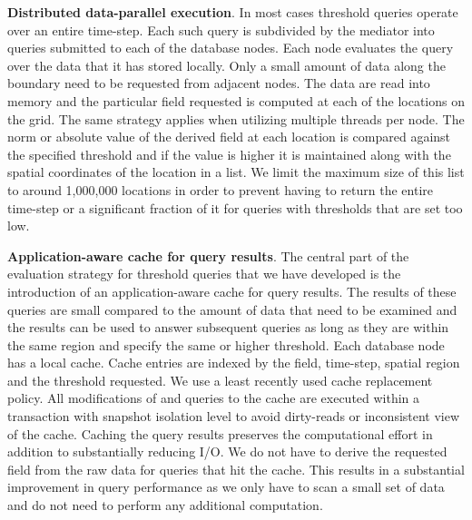 \documentclass{sig-alternate}
\newcommand{\kk}[1]{{\color{blue}{\it KK: #1}}}
\begin{document}
{\bf Distributed data-parallel execution}. In most cases threshold queries operate over an entire time-step. Each such query is subdivided by 
the mediator into queries submitted to
each of the database nodes. Each node evaluates the query over the data that it has stored locally. Only a small amount of data along the boundary
need to be requested from adjacent nodes. The data are read into memory and the particular field requested is computed at each of the locations on
the grid. The same strategy applies when utilizing multiple threads per node. The norm or absolute value of the derived field at each location is compared 
against the specified threshold and if the value is higher it is maintained along with
the spatial coordinates of the location in a list. We limit the maximum size of this list to around 1,000,000 locations in order to prevent having to return
the entire time-step or a significant fraction of it for queries with thresholds that are set too low. 

{\bf Application-aware cache for query results}. The central part of the evaluation strategy for threshold queries that we have developed is the 
introduction of an application-aware cache
for query results. The results of these queries are small compared to the amount of data that need to be examined and the results can be used to
answer subsequent queries as long as they are within the same region and specify the same or higher threshold. Each database node has a local 
cache. Cache entries are indexed by the field, time-step, spatial region and the threshold requested. We use a least recently
used cache replacement policy. All modifications of and queries to the cache are executed within a transaction with snapshot isolation level to
avoid dirty-reads or inconsistent view of the cache. Caching the query results
preserves the computational effort in addition to substantially reducing I/O. We do not have to derive the requested field from the raw data for 
queries that hit the cache. This results in a substantial improvement in query performance as we only have to scan
a small set of data and do not need to perform any additional computation.

\end{document}
